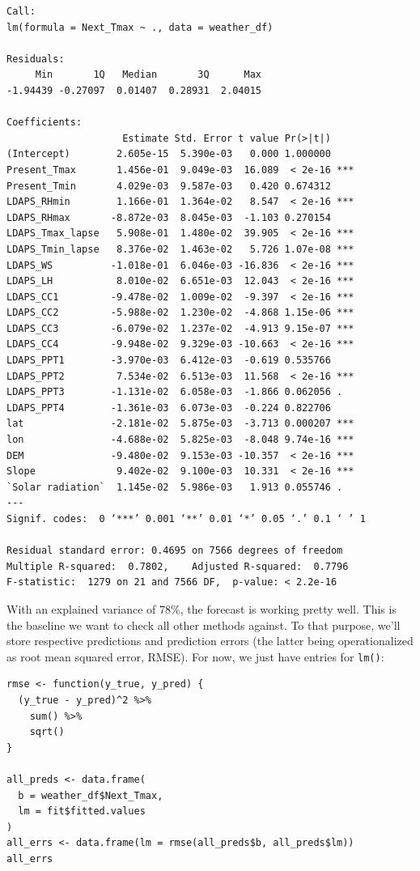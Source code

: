\documentclass[
  letterpaper,
]{krantz}
\begin{document}
\begin{verbatim}
Call:
lm(formula = Next_Tmax ~ ., data = weather_df)

Residuals:
     Min       1Q   Median       3Q      Max 
-1.94439 -0.27097  0.01407  0.28931  2.04015 

Coefficients:
                    Estimate Std. Error t value Pr(>|t|)    
(Intercept)        2.605e-15  5.390e-03   0.000 1.000000    
Present_Tmax       1.456e-01  9.049e-03  16.089  < 2e-16 ***
Present_Tmin       4.029e-03  9.587e-03   0.420 0.674312    
LDAPS_RHmin        1.166e-01  1.364e-02   8.547  < 2e-16 ***
LDAPS_RHmax       -8.872e-03  8.045e-03  -1.103 0.270154    
LDAPS_Tmax_lapse   5.908e-01  1.480e-02  39.905  < 2e-16 ***
LDAPS_Tmin_lapse   8.376e-02  1.463e-02   5.726 1.07e-08 ***
LDAPS_WS          -1.018e-01  6.046e-03 -16.836  < 2e-16 ***
LDAPS_LH           8.010e-02  6.651e-03  12.043  < 2e-16 ***
LDAPS_CC1         -9.478e-02  1.009e-02  -9.397  < 2e-16 ***
LDAPS_CC2         -5.988e-02  1.230e-02  -4.868 1.15e-06 ***
LDAPS_CC3         -6.079e-02  1.237e-02  -4.913 9.15e-07 ***
LDAPS_CC4         -9.948e-02  9.329e-03 -10.663  < 2e-16 ***
LDAPS_PPT1        -3.970e-03  6.412e-03  -0.619 0.535766    
LDAPS_PPT2         7.534e-02  6.513e-03  11.568  < 2e-16 ***
LDAPS_PPT3        -1.131e-02  6.058e-03  -1.866 0.062056 .  
LDAPS_PPT4        -1.361e-03  6.073e-03  -0.224 0.822706    
lat               -2.181e-02  5.875e-03  -3.713 0.000207 ***
lon               -4.688e-02  5.825e-03  -8.048 9.74e-16 ***
DEM               -9.480e-02  9.153e-03 -10.357  < 2e-16 ***
Slope              9.402e-02  9.100e-03  10.331  < 2e-16 ***
`Solar radiation`  1.145e-02  5.986e-03   1.913 0.055746 .  
---
Signif. codes:  0 ‘***’ 0.001 ‘**’ 0.01 ‘*’ 0.05 ‘.’ 0.1 ‘ ’ 1

Residual standard error: 0.4695 on 7566 degrees of freedom
Multiple R-squared:  0.7802,    Adjusted R-squared:  0.7796 
F-statistic:  1279 on 21 and 7566 DF,  p-value: < 2.2e-16
\end{verbatim}

With an explained variance of 78\%, the forecast is working pretty well.
This is the baseline we want to check all other methods against. To that
purpose, we'll store respective predictions and prediction errors (the
latter being operationalized as root mean squared error, RMSE). For now,
we just have entries for \texttt{lm()}:

\begin{verbatim}
rmse <- function(y_true, y_pred) {
  (y_true - y_pred)^2 %>%
    sum() %>%
    sqrt()
}

all_preds <- data.frame(
  b = weather_df$Next_Tmax,
  lm = fit$fitted.values
)
all_errs <- data.frame(lm = rmse(all_preds$b, all_preds$lm))
all_errs
\end{verbatim}
\end{document}

